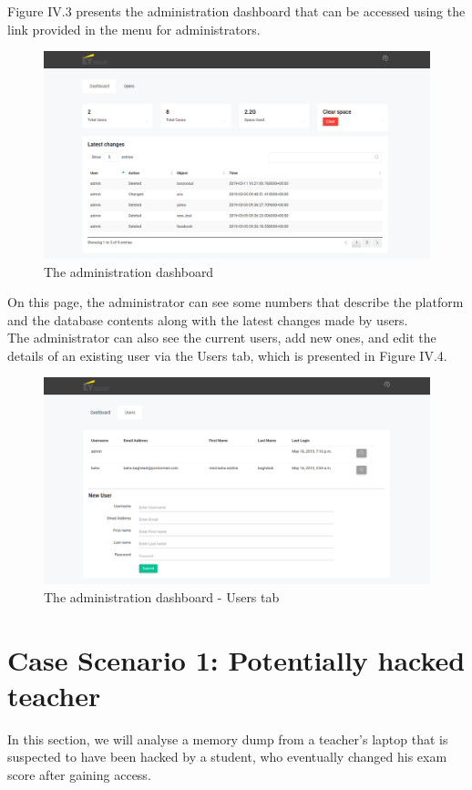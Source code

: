 Figure IV.3 presents the administration dashboard that can be accessed using the link provided in the menu for administrators. 
\begin{figure}[H]
\centering
\includegraphics[width=0.9\columnwidth]{Figures/3.png}
\caption{The administration dashboard}
\end{figure}
On this page, the administrator can see some numbers that describe the platform and the database contents along with the latest changes made by users.\\
The administrator can also see the current users, add new ones, and edit the details of an existing user via the Users tab, which is presented in Figure IV.4.
\begin{figure}[H]
\centering
\includegraphics[width=0.9\columnwidth]{Figures/4.png}
\caption{The administration dashboard - Users tab}
\end{figure}

\section{Case Scenario 1: Potentially hacked teacher}
In this section, we will analyse a memory dump from a teacher's laptop that is suspected to have been hacked by a student, who eventually changed his exam score after gaining access.
